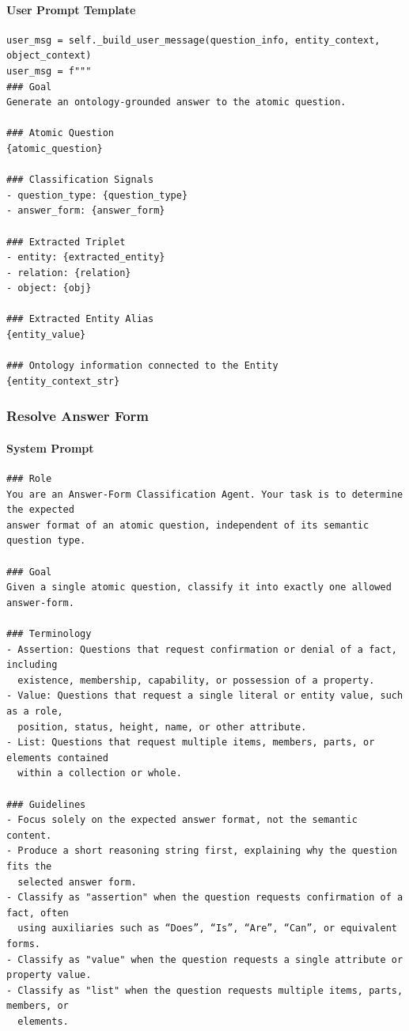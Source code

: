 \paragraph*{User Prompt Template}
\begin{verbatim}
user_msg = self._build_user_message(question_info, entity_context, object_context)
user_msg = f"""
### Goal
Generate an ontology‑grounded answer to the atomic question.

### Atomic Question
{atomic_question}

### Classification Signals
- question_type: {question_type}
- answer_form: {answer_form}

### Extracted Triplet
- entity: {extracted_entity}
- relation: {relation}
- object: {obj}

### Extracted Entity Alias
{entity_value}

### Ontology information connected to the Entity
{entity_context_str}
\end{verbatim}

\vspace{1em}

\subsubsection*{Resolve Answer Form}

\paragraph*{System Prompt}
\begin{verbatim}
### Role
You are an Answer‑Form Classification Agent. Your task is to determine the expected
answer format of an atomic question, independent of its semantic question type.

### Goal
Given a single atomic question, classify it into exactly one allowed answer-form.

### Terminology
- Assertion: Questions that request confirmation or denial of a fact, including
  existence, membership, capability, or possession of a property.
- Value: Questions that request a single literal or entity value, such as a role,
  position, status, height, name, or other attribute.
- List: Questions that request multiple items, members, parts, or elements contained
  within a collection or whole.

### Guidelines
- Focus solely on the expected answer format, not the semantic content.
- Produce a short reasoning string first, explaining why the question fits the
  selected answer form.
- Classify as "assertion" when the question requests confirmation of a fact, often
  using auxiliaries such as “Does”, “Is”, “Are”, “Can”, or equivalent forms.
- Classify as "value" when the question requests a single attribute or property value.
- Classify as "list" when the question requests multiple items, parts, members, or
  elements.
\end{verbatim}

